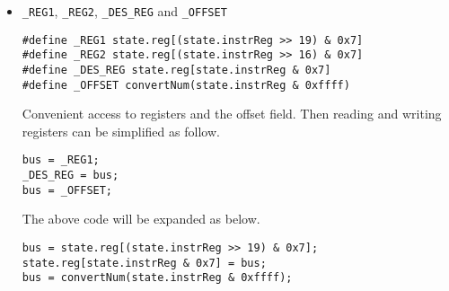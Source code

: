 \documentclass[a4paper]{article}
\begin{document}
\begin{itemize}
    \item \verb|_REG1|, \verb|_REG2|, \verb|_DES_REG| and \verb|_OFFSET|

        \begin{verbatim}
#define _REG1 state.reg[(state.instrReg >> 19) & 0x7]
#define _REG2 state.reg[(state.instrReg >> 16) & 0x7]
#define _DES_REG state.reg[state.instrReg & 0x7]
#define _OFFSET convertNum(state.instrReg & 0xffff)
        \end{verbatim}
        Convenient access to registers and the offset field. Then reading and writing registers can
        be simplified as follow.
        \begin{verbatim}
bus = _REG1;
_DES_REG = bus;
bus = _OFFSET;
        \end{verbatim}
        The above code will be expanded as below.
        \begin{verbatim}
bus = state.reg[(state.instrReg >> 19) & 0x7];
state.reg[state.instrReg & 0x7] = bus;
bus = convertNum(state.instrReg & 0xffff);
        \end{verbatim}
\end{itemize}
\end{document}
